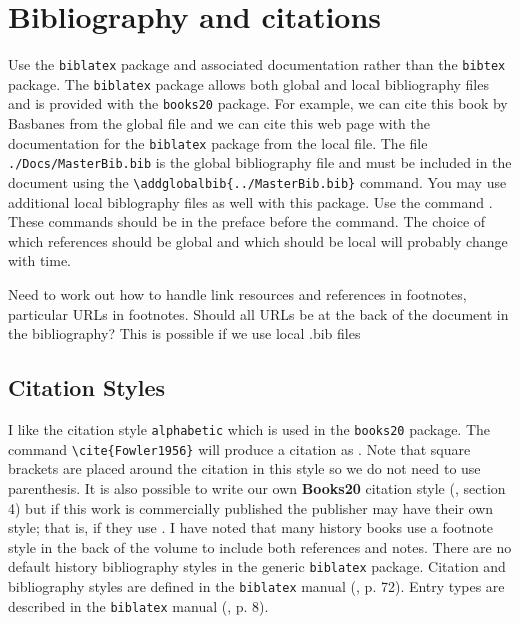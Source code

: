 

\section{Bibliography and citations}

Use the \texttt{biblatex} package \cite{Lehman2018} and associated
documentation \cite{Kime2019} rather than the \texttt{bibtex}
package. The \texttt{biblatex} package allows both global and local
bibliography files and is provided with the \texttt{books20} package.
For example, we can cite this book by Basbanes \cite{Basbanes2003}
from the global file and we can cite this web page with the
documentation for the \texttt{biblatex} package \cite{Lehman2018} from
the local file. The file \texttt{./Docs/MasterBib.bib} is the global
bibliography file and must be included in the document using the
\verb|\addglobalbib{../MasterBib.bib}| command. You may use additional
local biblography files as well with this package. Use the command
\verb||. These commands should be in the
preface before the \verb|| command. The choice of
which references should be global and which should be local will
probably change with time.
  
Need to work out how to handle link resources and references in
footnotes, particular URLs in footnotes. Should all URLs be at the
back of the document in the bibliography?  This is possible if we use
local .bib files

\subsection{Citation Styles}

I like the citation style \texttt{alphabetic} which is used in the
\texttt{books20} package. The command \verb|\cite{Fowler1956}| will
produce a citation as \cite{Fowler1956}. Note that square brackets are
placed around the citation in this style so we do not need to use
parenthesis. It is also possible to write our own \textbf{Books20}
citation style (\cite{Kime2019}, section 4) but if this work is
commercially published the publisher may have their own style; that
is, if they use \LaTeXe.  I have noted that many history books use a
footnote style in the back of the volume to include both references
and notes. There are no default history bibliography styles in the
generic \texttt{biblatex} package. Citation and bibliography styles
are defined in the \texttt{biblatex} manual (\cite{Kime2019},
p. 72).  Entry types are described in the \texttt{biblatex} manual
(\cite{Kime2019}, p. 8).

